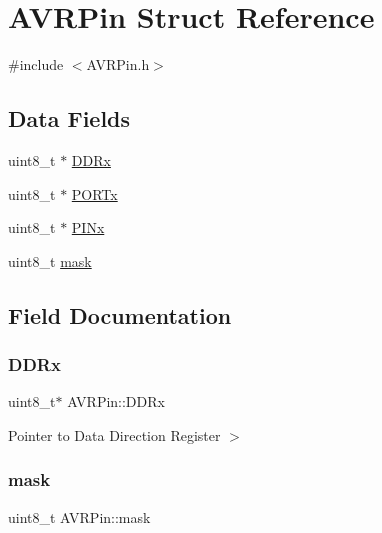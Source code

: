 \hypertarget{struct_a_v_r_pin}{}\section{A\+V\+R\+Pin Struct Reference}
\label{struct_a_v_r_pin}


{\ttfamily \#include $<$A\+V\+R\+Pin.\+h$>$}

\subsection*{Data Fields}
\begin{DoxyCompactItemize}
\item 
uint8\+\_\+t $\ast$ \mbox{\hyperlink{struct_a_v_r_pin_adb042bbebace45c3a4c754d245e56b65}{D\+D\+Rx}}
\item 
uint8\+\_\+t $\ast$ \mbox{\hyperlink{struct_a_v_r_pin_a1199bc37a19e3683ccce8e1baa3969ed}{P\+O\+R\+Tx}}
\item 
uint8\+\_\+t $\ast$ \mbox{\hyperlink{struct_a_v_r_pin_a79484fa0ab59addfe52792d1af2bd783}{P\+I\+Nx}}
\item 
uint8\+\_\+t \mbox{\hyperlink{struct_a_v_r_pin_a65e4b0d1fdbf7f283c7960098cdfbda7}{mask}}
\end{DoxyCompactItemize}


\subsection{Field Documentation}
\mbox{\label{struct_a_v_r_pin_adb042bbebace45c3a4c754d245e56b65}} 
\subsubsection{\texorpdfstring{D\+D\+Rx}{DDRx}}
{\footnotesize\ttfamily uint8\+\_\+t$\ast$ A\+V\+R\+Pin\+::\+D\+D\+Rx}

Pointer to Data Direction Register $>$ \mbox{\label{struct_a_v_r_pin_a65e4b0d1fdbf7f283c7960098cdfbda7}} 
\subsubsection{\texorpdfstring{mask}{mask}}
{\footnotesize\ttfamily uint8\+\_\+t A\+V\+R\+Pin\+::mask}

